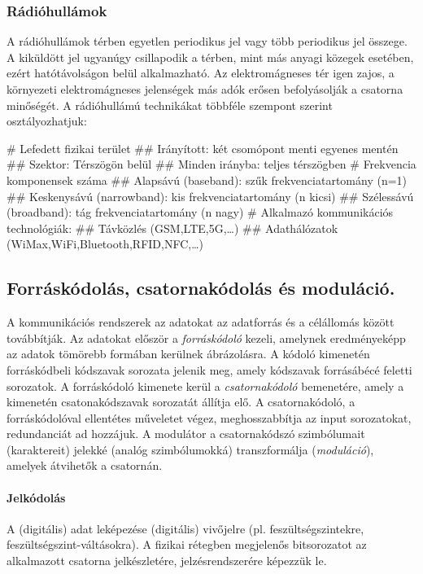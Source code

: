 \subsubsection{Rádióhullámok}
A rádióhullámok térben egyetlen periodikus jel vagy több periodikus jel összege. A kiküldött jel ugyanúgy csillapodik a térben, mint más anyagi közegek esetében, ezért hatótávolságon belül alkalmazható. Az elektromágneses tér igen zajos, a környezeti elektromágneses jelenségek más adók erősen befolyásolják a csatorna minőségét. A rádióhullámú technikákat többféle szempont szerint osztályozhatjuk:
\begin{easylist}[nosep]
	# Lefedett fizikai terület
	## Irányított: két csomópont menti egyenes mentén
	## Szektor: Térszögön belül
	## Minden irányba: teljes térszögben
	# Frekvencia komponensek száma
	## Alapsávú (baseband): szűk frekvenciatartomány (n=1)
	## Keskenysávú (narrowband): kis frekvenciatartomány (n kicsi)
	## Szélessávú (broadband): tág frekvenciatartomány (n nagy)
	# Alkalmazó kommunikációs technológiák:
	## Távközlés (GSM,LTE,5G,\dots)
	## Adathálózatok (WiMax,WiFi,Bluetooth,RFID,NFC,\dots)
\end{easylist}

\subsection{Forráskódolás, csatornakódolás és moduláció.}
A kommunikációs rendszerek az adatokat az adatforrás és a célállomás között
továbbítják. Az adatokat először a \emph{forráskódoló} kezeli, amelynek eredményeképp az adatok tömörebb formában kerülnek ábrázolásra. A kódoló kimenetén forráskódbeli kódszavak sorozata jelenik meg, amely kódszavak forrásábécé feletti sorozatok.
A forráskódoló kimenete kerül a \emph{csatornakódoló} bemenetére, amely a kimenetén csatonakódszavak sorozatát állítja elő. A csatornakódoló, a forráskódolóval ellentétes műveletet végez, meghosszabbítja az input sorozatokat, redundanciát ad hozzájuk.
A modulátor a csatornakódszó szimbólumait (karaktereit) jelekké (analóg szimbólumokká) transzformálja (\emph{moduláció}), amelyek átvihetők a csatornán.

\paragraph{Jelkódolás} A (digitális) adat leképezése (digitális) vivőjelre (pl. feszültségszintekre, feszültségszint-váltásokra). A fizikai rétegben megjelenős bitsorozatot az alkalmazott csatorna jelkészletére, jelzésrendszerére képezzük le.

